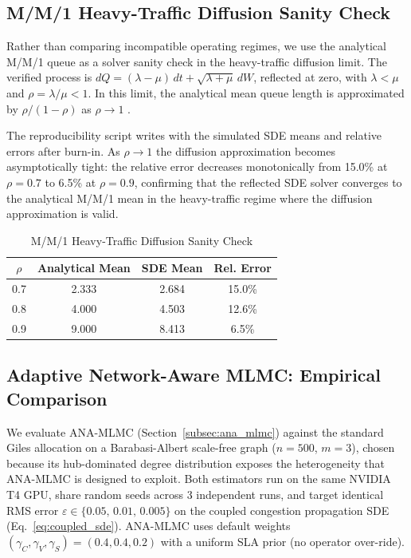 \documentclass[pdflatex,sn-mathphys-num]{sn-jnl}
\theoremstyle{thmstyleone}%
\theoremstyle{thmstyletwo}%
\theoremstyle{thmstylethree}%
\newcommand{\mmonererr}{6.5}
\newcommand{\mmonererrA}{15.0}
\newcommand{\mmonererrB}{12.6}
\newcommand{\mmonererrC}{6.5}
\begin{document}
\subsection{M/M/1 Heavy-Traffic Diffusion Sanity Check}
\label{subsec:analytical}

Rather than comparing incompatible operating regimes, we use the analytical M/M/1 queue as a
solver sanity check in the heavy-traffic diffusion limit. The verified process is
$dQ = (\lambda-\mu)\,dt + \sqrt{\lambda+\mu}\,dW$, reflected at zero, with $\lambda < \mu$ and
$\rho=\lambda/\mu<1$. In this limit, the analytical mean queue length is approximated by
$\rho/(1-\rho)$ as $\rho \to 1$ \cite{whitt2002,harrison1985,kang2007}.

The reproducibility script  writes
 with the simulated SDE means and relative errors after burn-in.
As $\rho\!\to\!1$ the diffusion approximation becomes asymptotically tight: the relative error
decreases monotonically from \mmonererrA\% at $\rho=0.7$ to \mmonererr\% at $\rho=0.9$,
confirming that the reflected SDE solver converges to the analytical M/M/1 mean in the
heavy-traffic regime where the diffusion approximation is valid.

\begin{table}[!t]
\caption{M/M/1 Heavy-Traffic Diffusion Sanity Check}
\label{tab:mm1_sanity}
\centering
\begin{tabular}{@{}c c c c@{}}
\toprule
$\rho$ & Analytical Mean & SDE Mean & Rel. Error \\
\midrule
0.7 & 2.333 & 2.684 & \mmonererrA\% \\
0.8 & 4.000 & 4.503 & \mmonererrB\% \\
0.9 & 9.000 & 8.413 & \mmonererrC\% \\
\bottomrule
\end{tabular}
\end{table}

\subsection{Adaptive Network-Aware MLMC: Empirical Comparison}
\label{subsec:ana_results}

We evaluate ANA-MLMC (Section~\ref{subsec:ana_mlmc}) against the standard Giles allocation on a
Barabasi-Albert scale-free graph ($n=500$, $m=3$), chosen because its hub-dominated degree
distribution exposes the heterogeneity that ANA-MLMC is designed to exploit. Both estimators run
on the same NVIDIA T4 GPU, share random seeds across 3 independent runs, and target identical RMS
error $\varepsilon \in \{0.05,\,0.01,\,0.005\}$ on the coupled congestion propagation SDE
(Eq.~\eqref{eq:coupled_sde}). ANA-MLMC uses default weights
$(\gamma_C,\gamma_V,\gamma_S)=(0.4,0.4,0.2)$ with a uniform SLA prior (no operator over-ride).
\end{document}

